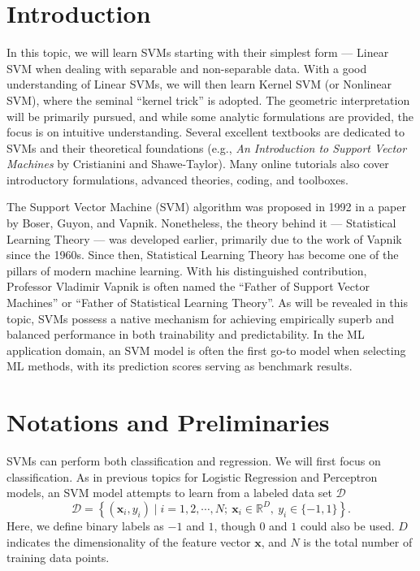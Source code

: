 \documentclass[12pt]{article}
\begin{document}
\section{Introduction}
In this topic, we will learn SVMs starting with their simplest form --- Linear SVM when dealing with separable and non-separable data. With a good understanding of Linear SVMs, we will then learn Kernel SVM (or Nonlinear SVM), where the seminal ``kernel trick'' is adopted. The geometric interpretation will be primarily pursued, and while some analytic formulations are provided, the focus is on intuitive understanding. Several excellent textbooks are dedicated to SVMs and their theoretical foundations (e.g., \textit{An Introduction to Support Vector Machines} by Cristianini and Shawe-Taylor). Many online tutorials also cover introductory formulations, advanced theories, coding, and toolboxes.

The Support Vector Machine (SVM) algorithm was proposed in 1992 in a paper by Boser, Guyon, and Vapnik. Nonetheless, the theory behind it --- Statistical Learning Theory --- was developed earlier, primarily due to the work of Vapnik since the 1960s. Since then, Statistical Learning Theory has become one of the pillars of modern machine learning. With his distinguished contribution, Professor Vladimir Vapnik is often named the ``Father of Support Vector Machines'' or ``Father of Statistical Learning Theory''. As will be revealed in this topic, SVMs possess a native mechanism for achieving empirically superb and balanced performance in both trainability and predictability. In the ML application domain, an SVM model is often the first go-to model when selecting ML methods, with its prediction scores serving as benchmark results.

\section{Notations and Preliminaries}
SVMs can perform both classification and regression. We will first focus on classification. As in previous topics for Logistic Regression and Perceptron models, an SVM model attempts to learn from a labeled data set $\mathcal{D}$
\[
\mathcal{D} = \left\{ (\bm{x}_i, y_i) \mid i = 1, 2, \cdots, N; \ \bm{x}_i \in \mathbb{R}^D, \ y_i \in \{-1, 1\} \right\}.
\]
Here, we define binary labels as $-1$ and $1$, though $0$ and $1$ could also be used. $D$ indicates the dimensionality of the feature vector $\bm{x}$, and $N$ is the total number of training data points.
\end{document}

